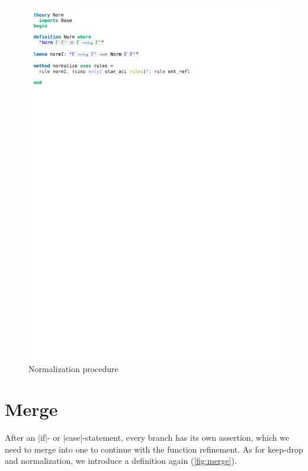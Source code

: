 \begin{figure}[htpb]
    \includegraphics[trim={0 23,9cm 0 3,9cm}, clip, width=1.00\textwidth]{figures/Theory_Norm.pdf}
    \caption[Normalization procedure]{Normalization procedure}
    \label{fig:norm_procedure}
\end{figure}

\section{Merge}

After an |if|- or |case|-statement, every branch has its own assertion, which we need to merge into one to continue with the function refinement. As for keep-drop and normalization, we introduce a definition again (\autoref{fig:merge}).

